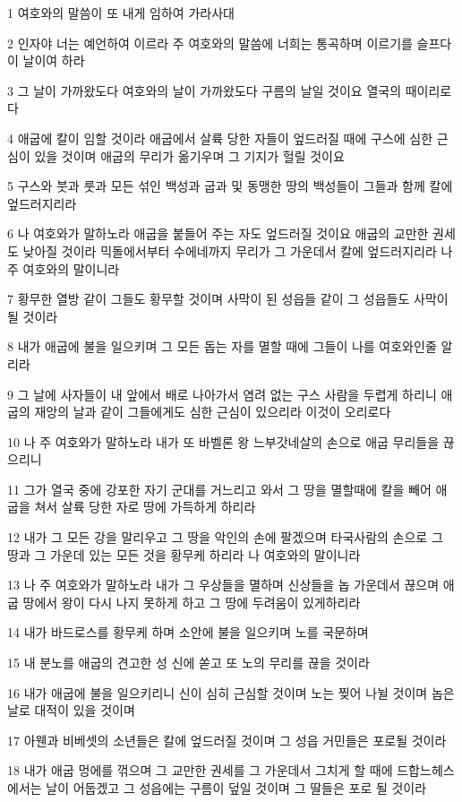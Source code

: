 \par 1 여호와의 말씀이 또 내게 임하여 가라사대
\par 2 인자야 너는 예언하여 이르라 주 여호와의 말씀에 너희는 통곡하며 이르기를 슬프다 이 날이여 하라
\par 3 그 날이 가까왔도다 여호와의 날이 가까왔도다 구름의 날일 것이요 열국의 때이리로다
\par 4 애굽에 칼이 임할 것이라 애굽에서 살륙 당한 자들이 엎드러질 때에 구스에 심한 근심이 있을 것이며 애굽의 무리가 옮기우며 그 기지가 헐릴 것이요
\par 5 구스와 붓과 룻과 모든 섞인 백성과 굽과 및 동맹한 땅의 백성들이 그들과 함께 칼에 엎드러지리라
\par 6 나 여호와가 말하노라 애굽을 붙들어 주는 자도 엎드러질 것이요 애굽의 교만한 권세도 낮아질 것이라 믹돌에서부터 수에네까지 무리가 그 가운데서 칼에 엎드러지리라 나 주 여호와의 말이니라
\par 7 황무한 열방 같이 그들도 황무할 것이며 사막이 된 성읍들 같이 그 성읍들도 사막이 될 것이라
\par 8 내가 애굽에 불을 일으키며 그 모든 돕는 자를 멸할 때에 그들이 나를 여호와인줄 알리라
\par 9 그 날에 사자들이 내 앞에서 배로 나아가서 염려 없는 구스 사람을 두렵게 하리니 애굽의 재앙의 날과 같이 그들에게도 심한 근심이 있으리라 이것이 오리로다
\par 10 나 주 여호와가 말하노라 내가 또 바벨론 왕 느부갓네살의 손으로 애굽 무리들을 끊으리니
\par 11 그가 열국 중에 강포한 자기 군대를 거느리고 와서 그 땅을 멸할때에 칼을 빼어 애굽을 쳐서 살륙 당한 자로 땅에 가득하게 하리라
\par 12 내가 그 모든 강을 말리우고 그 땅을 악인의 손에 팔겠으며 타국사람의 손으로 그 땅과 그 가운데 있는 모든 것을 황무케 하리라 나 여호와의 말이니라
\par 13 나 주 여호와가 말하노라 내가 그 우상들을 멸하며 신상들을 놉 가운데서 끊으며 애굽 땅에서 왕이 다시 나지 못하게 하고 그 땅에 두려움이 있게하리라
\par 14 내가 바드로스를 황무케 하며 소안에 불을 일으키며 노를 국문하며
\par 15 내 분노를 애굽의 견고한 성 신에 쏟고 또 노의 무리를 끊을 것이라
\par 16 내가 애굽에 불을 일으키리니 신이 심히 근심할 것이며 노는 찢어 나뉠 것이며 놉은 날로 대적이 있을 것이며
\par 17 아웬과 비베셋의 소년들은 칼에 엎드러질 것이며 그 성읍 거민들은 포로될 것이라
\par 18 내가 애굽 멍에를 꺾으며 그 교만한 권세를 그 가운데서 그치게 할 때에 드합느헤스에서는 날이 어둡겠고 그 성읍에는 구름이 덮일 것이며 그 딸들은 포로 될 것이라
